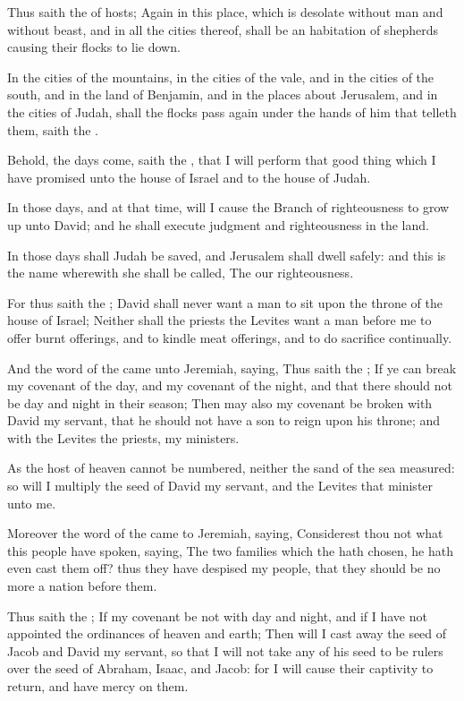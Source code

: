 \Verse Thus saith the \LORD of hosts; Again in this place, which is desolate without man and without beast, and in all the cities thereof, shall be an habitation of shepherds causing their flocks to lie down.

\Verse In the cities of the mountains, in the cities of the vale, and in the cities of the south, and in the land of Benjamin, and in the places about Jerusalem, and in the cities of Judah, shall the flocks pass again under the hands of him that telleth them, saith the \LORD.

\Verse Behold, the days come, saith the \LORD, that I will perform that good thing which I have promised unto the house of Israel and to the house of Judah.

\Verse In those days, and at that time, will I cause the Branch of righteousness to grow up unto David; and he shall execute judgment and righteousness in the land.

\Verse In those days shall Judah be saved, and Jerusalem shall dwell safely: and this is the name wherewith she shall be called, The \LORD our righteousness.

\Verse For thus saith the \LORD; David shall never want a man to sit upon the throne of the house of Israel; \Verse Neither shall the priests the Levites want a man before me to offer burnt offerings, and to kindle meat offerings, and to do sacrifice continually.

\Verse And the word of the \LORD came unto Jeremiah, saying, \Verse Thus saith the \LORD; If ye can break my covenant of the day, and my covenant of the night, and that there should not be day and night in their season; \Verse Then may also my covenant be broken with David my servant, that he should not have a son to reign upon his throne; and with the Levites the priests, my ministers.

\Verse As the host of heaven cannot be numbered, neither the sand of the sea measured: so will I multiply the seed of David my servant, and the Levites that minister unto me.

\Verse Moreover the word of the \LORD came to Jeremiah, saying, \Verse Considerest thou not what this people have spoken, saying, The two families which the \LORD hath chosen, he hath even cast them off? thus they have despised my people, that they should be no more a nation before them.

\Verse Thus saith the \LORD; If my covenant be not with day and night, and if I have not appointed the ordinances of heaven and earth; \Verse Then will I cast away the seed of Jacob and David my servant, so that I will not take any of his seed to be rulers over the seed of Abraham, Isaac, and Jacob: for I will cause their captivity to return, and have mercy on them.


